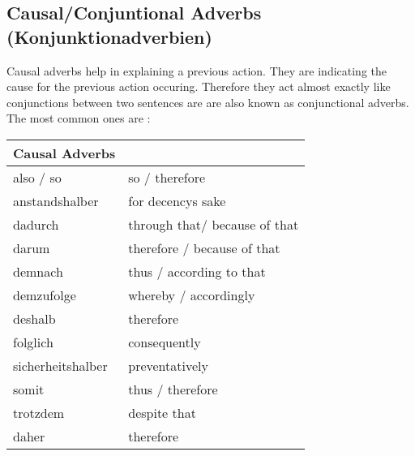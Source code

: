\documentclass[a4paper,12pt]{article}
\begin{document}
\subsection{\bf{Causal/Conjuntional Adverbs (Konjunktionadverbien)}}
\begin{adjustwidth}{2em}{0pt}
\label{sec:causal_adverbs}

Causal adverbs help in explaining a previous action. They are indicating the
cause for the previous action occuring. Therefore they act almost exactly like
conjunctions between two sentences are are also known as conjunctional adverbs.
The most common ones are :

\begin{minipage}{.5\linewidth}
\vspace{0.3cm}
\begin{tabular}{l|l}
\toprule
\rowcolor{goethe_green}
\multicolumn{2}{c}
{\color{white} \textbf{Causal Adverbs} \color{black}} \\
\midrule
\rowcolor{white}     also / so         & so / therefore \\
\rowcolor{lightgray} anstandshalber    & for decencys sake\\
\rowcolor{white}     dadurch           & through that/ because of that\\
\rowcolor{lightgray} darum             & therefore / because of that\\
\rowcolor{white}     demnach           & thus / according to that\\
\rowcolor{lightgray} demzufolge        & whereby / accordingly\\
\rowcolor{white}     deshalb           & therefore\\
\rowcolor{lightgray} folglich          & consequently\\
\rowcolor{white}     sicherheitshalber & preventatively\\
\rowcolor{lightgray} somit             & thus / therefore\\
\rowcolor{white}     trotzdem          & despite that\\
\rowcolor{lightgray} daher             & therefore\\

\bottomrule
\end{tabular}
\vspace{0.3cm}
\newline
\end{minipage}

\end{adjustwidth}
\end{document}
